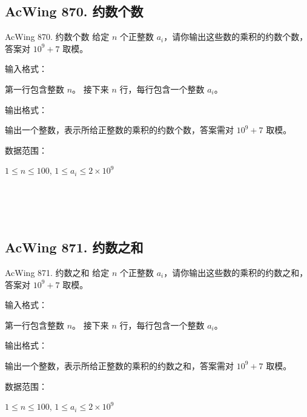 \subsection{AcWing 870. 约数个数}

\begin{titledbox}{AcWing 870. 约数个数}
    给定 $n$ 个正整数 $a_i$，请你输出这些数的乘积的约数个数，答案对 $10^9+7$ 取模。

    输入格式：

    第一行包含整数 $n$。 接下来 $n$ 行，每行包含一个整数 $a_i$。

    输出格式：

    输出一个整数，表示所给正整数的乘积的约数个数，答案需对 $10^9+7$ 取模。

    数据范围：

    $1 \le n \le 100$, $1 \le a_i \le 2 \times 10^9$

    \begin{inputblock}
         \\
         \\
         \\
    \end{inputblock}
    \begin{outputblock}
    \end{outputblock}
\end{titledbox}

\subsection{AcWing 871. 约数之和}
\begin{titledbox}{AcWing 871. 约数之和}
    给定 $n$ 个正整数 $a_i$，请你输出这些数的乘积的约数之和，答案对 $10^9+7$ 取模。

    输入格式：

    第一行包含整数 $n$。 接下来 $n$ 行，每行包含一个整数 $a_i$。

    输出格式：

    输出一个整数，表示所给正整数的乘积的约数之和，答案需对 $10^9+7$ 取模。

    数据范围：

    $1 \le n \le 100$, $1 \le a_i \le 2 \times 10^9$

    \begin{inputblock}
         \\
         \\
         \\
    \end{inputblock}
    \begin{outputblock}
    \end{outputblock}
\end{titledbox}

